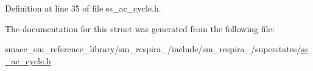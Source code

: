 Definition at line 35 of file ss\+\_\+ac\+\_\+cycle.\+h.



The documentation for this struct was generated from the following file\+:\begin{DoxyCompactItemize}
\item 
smacc\+\_\+sm\+\_\+reference\+\_\+library/sm\+\_\+respira\+\_/include/sm\+\_\+respira\+\_/superstates/\hyperlink{ss__ac__cycle_8h}{ss\+\_\+ac\+\_\+cycle.\+h}\end{DoxyCompactItemize}
